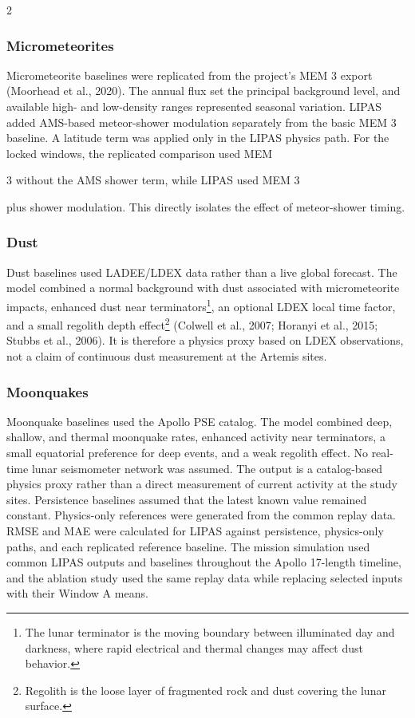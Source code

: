 \begin{multicols*}{2}
\subsubsection{Micrometeorites}

Micrometeorite baselines were replicated from the project's MEM 3 export (Moorhead et al., 2020). The annual flux set the principal background level, and available high- and low-density ranges represented seasonal variation. LIPAS added AMS-based meteor-shower modulation separately from the basic MEM 3 baseline. A latitude term was applied only in the LIPAS physics path. For the locked windows, the replicated comparison used MEM

3 without the AMS shower term, while LIPAS used MEM 3

plus shower modulation. This directly isolates the effect of meteor-shower timing.

\subsubsection{Dust}

Dust baselines used LADEE/LDEX data rather than a live global forecast. The model combined a normal background with dust associated with micrometeorite impacts, enhanced dust near terminators\footnote{The lunar terminator is the moving boundary between illuminated day and darkness, where rapid electrical and thermal changes may affect dust behavior.}, an optional LDEX local time factor, and a small regolith depth effect\footnote{Regolith is the loose layer of fragmented rock and dust covering the lunar surface.} (Colwell et al., 2007; Horanyi et al., 2015; Stubbs et al., 2006). It is therefore a physics proxy based on LDEX observations, not a claim of continuous dust measurement at the Artemis sites.

\subsubsection{Moonquakes}

Moonquake baselines used the Apollo PSE catalog. The model combined deep, shallow, and thermal moonquake rates, enhanced activity near terminators, a small equatorial preference for deep events, and a weak regolith effect. No real-time lunar seismometer network was assumed. The output is a catalog-based physics proxy rather than a direct measurement of current activity at the study sites. Persistence baselines assumed that the latest known value remained constant. Physics-only references were generated from the common replay data. RMSE and MAE were calculated for LIPAS against persistence, physics-only paths, and each replicated reference baseline. The mission simulation used common LIPAS outputs and baselines throughout the Apollo 17-length timeline, and the ablation study used the same replay data while replacing selected inputs with their Window A means.

\end{multicols*}
